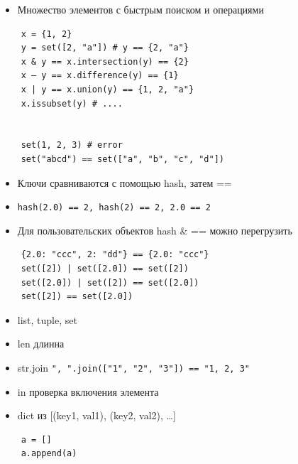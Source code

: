 \documentclass{article}
\begin{document}
\begin{itemize}
	\item Множество элементов с быстрым поиском и операциями
\end{itemize}
\vspace{15pt}
\begin{lstlisting}
	x = {1, 2} 
	y = set([2, "a"]) # y == {2, "a"}
	x & y == x.intersection(y) == {2}
	x – y == x.difference(y) == {1}
	x | y == x.union(y) == {1, 2, "a"}
	x.issubset(y) # ....


	set(1, 2, 3) # error
	set("abcd") == set(["a", "b", "c", "d"])
\end{lstlisting}
\newpage

\begin{itemize}
	\item Ключи сравниваются с помощью hash, затем ==
	\item \lstinline!hash(2.0) == 2, hash(2) == 2, 2.0 == 2!
	\item Для пользовательских объектов hash \& == можно перегрузить
\end{itemize}
\begin{lstlisting}
	{2.0: "ccc", 2: "dd"} == {2.0: "ccc"}
	set([2]) | set([2.0]) == set([2])
	set([2.0]) | set([2]) == set([2.0])
	set([2]) == set([2.0])
\end{lstlisting}
\newpage

\begin{itemize}
	\item list, tuple, set
	\item len длинна 
	\item str.join \lstinline!", ".join(["1", "2", "3"]) == "1, 2, 3"! 
	\item in проверка включения элемента
	\item dict из [(key1, val1), (key2, val2), …]
\end{itemize}
\newpage

\vspace{15pt}
\begin{lstlisting}
	a = []
	a.append(a)
\end{lstlisting}
\newpage
\end{document}
